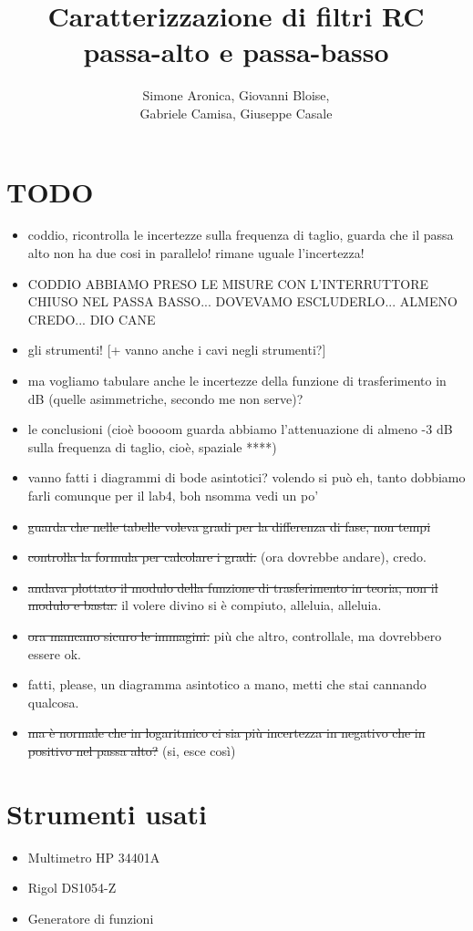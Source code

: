 \documentclass{article}
\title{Caratterizzazione di filtri RC passa-alto e passa-basso}
\author{Simone Aronica, Giovanni Bloise, \\
Gabriele Camisa, Giuseppe Casale}
\begin{document}
\maketitle
\tableofcontents
\pagebreak

\section{TODO}
\begin{itemize}
  \item coddio, ricontrolla le incertezze sulla frequenza di taglio, guarda che il passa alto non ha due cosi in parallelo! rimane uguale l'incertezza!
  \item CODDIO ABBIAMO PRESO LE MISURE CON L'INTERRUTTORE CHIUSO NEL PASSA BASSO... DOVEVAMO ESCLUDERLO... ALMENO CREDO... DIO CANE
  \item gli strumenti! [+ vanno anche i cavi negli strumenti?]
  \item ma vogliamo tabulare anche le incertezze della funzione di trasferimento in dB (quelle asimmetriche, secondo me non serve)?
  \item le conclusioni (cioè boooom guarda abbiamo l'attenuazione di almeno -3 dB sulla frequenza di taglio, cioè, spaziale ****)
  \item vanno fatti i diagrammi di bode asintotici? volendo si può eh, tanto dobbiamo farli comunque per il lab4, boh nsomma vedi un po'
  \item \sout{guarda che nelle tabelle voleva gradi per la differenza di fase, non tempi}
  \item \sout{controlla la formula per calcolare i gradi.} (ora dovrebbe andare), credo.
  \item \sout{andava plottato il modulo della funzione di trasferimento in teoria, non il modulo e basta.} il volere divino si è compiuto, alleluia, alleluia.
  \item \sout{ora mancano sicuro le immagini.} più che altro, controllale, ma dovrebbero essere ok.
  \item fatti, please, un diagramma asintotico a mano, metti che stai cannando qualcosa.
  \item \sout{ma è normale che in logaritmico ci sia più incertezza in negativo che in positivo nel passa alto?} (si, esce così)
\end{itemize}

\section{Strumenti usati}
\begin{itemize}
    \item Multimetro HP 34401A
    \item Rigol DS1054-Z
    \item Generatore di funzioni
\end{itemize}
\end{document}
